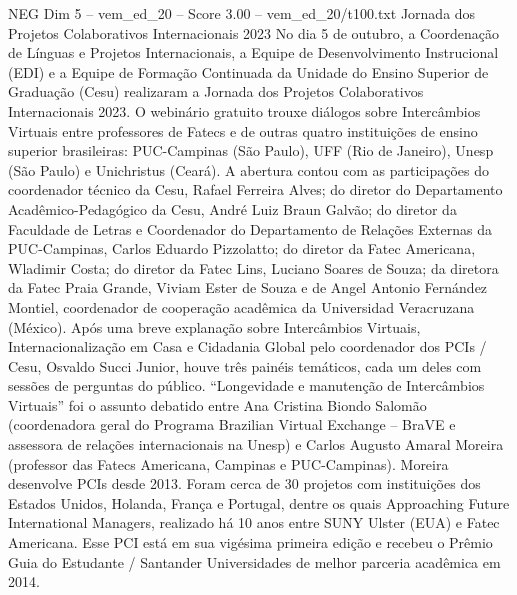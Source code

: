 \begin{textsample}{NEG Dim 5 – vem\_ed\_20 – Score 3.00 – vem\_ed\_20/t100.txt}  \label{ex:f5_neg_063}
Jornada dos Projetos Colaborativos Internacionais 2023 No dia 5 de outubro, a Coordenação de Línguas e Projetos Internacionais, a Equipe de Desenvolvimento Instrucional (EDI) e a Equipe de Formação Continuada da Unidade do Ensino Superior de Graduação (Cesu) realizaram a Jornada dos Projetos Colaborativos Internacionais 2023.
O webinário gratuito trouxe diálogos sobre Intercâmbios Virtuais entre professores de Fatecs e de outras quatro instituições de ensino superior brasileiras: PUC-Campinas (São Paulo), UFF (Rio de Janeiro), Unesp (São Paulo) e Unichristus (Ceará).
A abertura contou com as participações do coordenador técnico da Cesu, Rafael Ferreira Alves; do diretor do Departamento Acadêmico-Pedagógico da Cesu, André Luiz Braun Galvão; do diretor da Faculdade de Letras e Coordenador do Departamento de Relações Externas da PUC-Campinas, Carlos Eduardo Pizzolatto; do diretor da Fatec Americana, Wladimir Costa; do diretor da Fatec Lins, Luciano Soares de Souza; da diretora da Fatec Praia Grande, Viviam Ester de Souza e de Angel Antonio Fernández Montiel, coordenador de cooperação acadêmica da Universidad Veracruzana (México).
Após uma breve explanação sobre Intercâmbios Virtuais, Internacionalização em Casa e Cidadania Global pelo coordenador dos PCIs / Cesu, Osvaldo Succi Junior, houve três painéis temáticos, cada um deles com sessões de perguntas do público. “Longevidade e manutenção de Intercâmbios Virtuais” foi o assunto debatido entre Ana Cristina Biondo Salomão (coordenadora geral do Programa Brazilian Virtual Exchange – BraVE e assessora de relações internacionais na Unesp) e Carlos Augusto Amaral Moreira (professor das Fatecs Americana, Campinas e PUC-Campinas).
Moreira desenvolve PCIs desde 2013.
Foram cerca de 30 projetos com instituições dos Estados Unidos, Holanda, França e Portugal, dentre os quais Approaching Future International Managers, realizado há 10 anos entre SUNY Ulster (EUA) e Fatec Americana.
Esse PCI está em sua vigésima primeira edição e recebeu o Prêmio Guia do Estudante / Santander Universidades de melhor parceria acadêmica em 2014.

\end{textsample}
